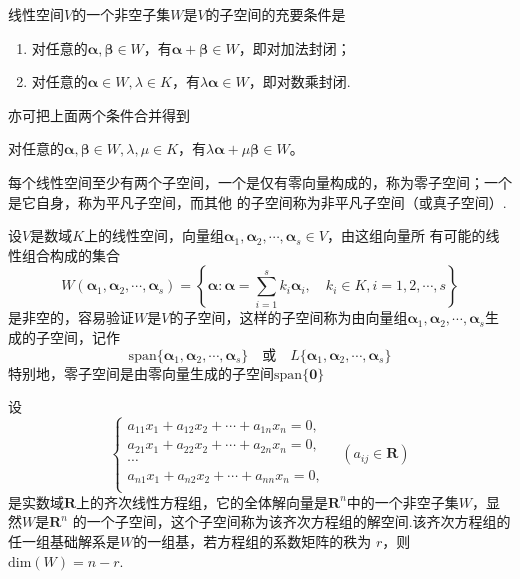     \begin{theorem}
        线性空间$V$的一个非空子集$W$是$V$的子空间的充要条件是
        \begin{enumerate}[(1)]
            \item 对任意的$\boldsymbol{\alpha},\boldsymbol{\beta}\in W$，有$\boldsymbol{\alpha}+\boldsymbol{\beta}\in W$，即对加法封闭；
            \item 对任意的$\boldsymbol{\alpha}\in W,\lambda\in K$，有$\lambda\boldsymbol{\alpha}\in W$，即对数乘封闭.
        \end{enumerate}
        亦可把上面两个条件合并得到

        对任意的$\boldsymbol{\alpha},\boldsymbol{\beta}\in W,\lambda,\mu\in K$，有$\lambda\boldsymbol{\alpha}+\mu\boldsymbol{\beta}\in W$。
    \end{theorem}

    \begin{definition}
        每个线性空间至少有两个子空间，一个是仅有零向量构成的，称为{\heiti 零子空间}；一个是它自身，称为{\heiti 平凡子空间}，而其他
        的子空间称为非平凡子空间（或{\heiti 真子空间}）.
    \end{definition}

    \begin{definition}
        设$V$是数域$K$上的线性空间，向量组$\boldsymbol{\alpha}_1,\boldsymbol{\alpha}_2,\cdots,\boldsymbol{\alpha}_s\in V$，由这组向量所
        有可能的线性组合构成的集合
        $$W(\boldsymbol{\alpha}_1,\boldsymbol{\alpha}_2,\cdots,\boldsymbol{\alpha}_s)=\left\{\boldsymbol{\alpha}:\boldsymbol{\alpha}=\sum_{i=1}^s k_i\boldsymbol{\alpha}_i,\quad k_i\in K,i=1,2,\cdots,s\right\}$$
        是非空的，容易验证$W$是$V$的子空间，这样的子空间称为由向量组$\boldsymbol{\alpha}_1,\boldsymbol{\alpha}_2,\cdots,\boldsymbol{\alpha}_s$生成的子空间，记作
        $$\mathrm{span}\{\boldsymbol{\alpha}_1,\boldsymbol{\alpha}_2,\cdots,\boldsymbol{\alpha}_s\} \quad \mbox{或} \quad L\{\boldsymbol{\alpha}_1,\boldsymbol{\alpha}_2,\cdots,\boldsymbol{\alpha}_s\}$$
        特别地，零子空间是由零向量生成的子空间$\mathrm{span}\{\boldsymbol{0}\}$

        设
        $$\left\{\begin{array}{l}
            a_{11}x_1+a_{12}x_2+\cdots+a_{1n}x_n=0,\\
            a_{21}x_1+a_{22}x_2+\cdots+a_{2n}x_n=0,\\
            \cdots\\
            a_{n1}x_1+a_{n2}x_2+\cdots+a_{nn}x_n=0,\\
        \end{array}\right.\quad (a_{ij}\in\mathbf{R})$$
        是实数域$\mathbf{R}$上的齐次线性方程组，它的全体解向量是$\mathbf{R}^n$中的一个非空子集$W$，显然$W$是$\mathbf{R}^n$
        的一个子空间，这个子空间称为该齐次方程组的{\heiti 解空间}.该齐次方程组的任一组基础解系是$W$的一组基，若方程组的系数矩阵的秩为
        $r$，则$\mathrm{dim}(W)=n-r$.
    \end{definition}


